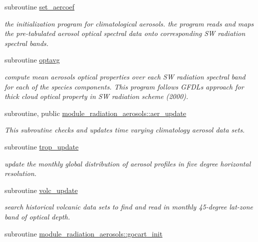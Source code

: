 \begin{DoxyCompactItemize}
subroutine \hyperlink{radiation__aerosols_8f_a95fabbc4272ae70f3b345f9b1a898d46}{set\+\_\+aercoef}
\begin{DoxyCompactList}\small\item\em the initialization program for climatological aerosols. the program reads and maps the pre-\/tabulated aerosol optical spectral data onto corresponding SW radiation spectral bands. \end{DoxyCompactList}\item 
subroutine \hyperlink{radiation__aerosols_8f_a637761b6110739f2d96322e2ddcc1291}{optavg}
\begin{DoxyCompactList}\small\item\em compute mean aerosols optical properties over each SW radiation spectral band for each of the species components. This program follows G\+F\+DL\textquotesingle{}s approach for thick cloud optical property in SW radiation scheme (2000). \end{DoxyCompactList}\item 
subroutine, public \hyperlink{namespacemodule__radiation__aerosols_a2a91dba33725576c80b4b0f556031707}{module\+\_\+radiation\+\_\+aerosols\+::aer\+\_\+update}                                                                                       
\begin{DoxyCompactList}\small\item\em This subroutine checks and updates time varying climatology aerosol data sets. \end{DoxyCompactList}\item 
subroutine \hyperlink{radiation__aerosols_8f_afac9a9c603c033c8511e8dbfe984f703}{trop\+\_\+update}
\begin{DoxyCompactList}\small\item\em update the monthly global distribution of aerosol profiles in five degree horizontal resolution. \end{DoxyCompactList}\item 
subroutine \hyperlink{radiation__aerosols_8f_a6ec9bd68d45a5f2c6bb9997bdad420c3}{volc\+\_\+update}
\begin{DoxyCompactList}\small\item\em search historical volcanic data sets to find and read in monthly 45-\/degree lat-\/zone band of optical depth. \end{DoxyCompactList}\item 
subroutine \hyperlink{namespacemodule__radiation__aerosols_a5db43ed91d1c7c83dfee64f12f2bf354}{module\+\_\+radiation\+\_\+aerosols\+::gocart\+\_\+init}                                                                                     

\end{DoxyCompactItemize}
